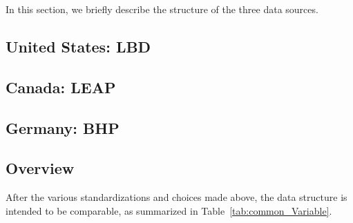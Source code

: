 
In this section, we briefly describe the structure of the three data sources.%

\subsection{United States: \acf{LBD}}



\subsection{Canada: \acf{LEAP}}



\subsection{Germany: \acf{BHP}}



\subsection{Overview}

After the various standardizations and choices made above, the data structure is intended to be comparable, as summarized in Table~\ref{tab:common_Variable}.

%

